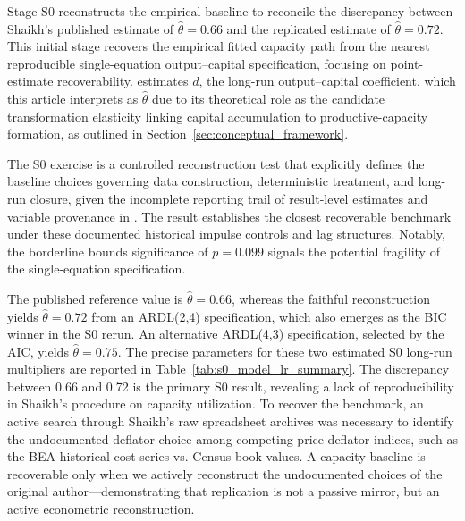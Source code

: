 \documentclass[11pt]{article}
\begin{document}
Stage S0 reconstructs the empirical baseline to reconcile the discrepancy between Shaikh's published estimate of $\hat{\theta}=0.66$ and the replicated estimate of $\hat{\theta}=0.72$. This initial stage recovers the empirical fitted capacity path from the nearest reproducible single-equation output--capital specification, focusing on point-estimate recoverability. \citet{Shaikh2016} estimates $d$, the long-run output--capital coefficient, which this article interprets as $\hat{\theta}$ due to its theoretical role as the candidate transformation elasticity linking capital accumulation to productive-capacity formation, as outlined in Section~\ref{sec:conceptual_framework}.

The S0 exercise is a controlled reconstruction test that explicitly defines the baseline choices governing data construction, deterministic treatment, and long-run closure, given the incomplete reporting trail of result-level estimates and variable provenance in \citet{Shaikh2016}. The result establishes the closest recoverable benchmark under these documented historical impulse controls and lag structures. Notably, the borderline bounds significance of $p=0.099$ signals the potential fragility of the single-equation specification.

The published reference value is $\hat{\theta}=0.66$, whereas the faithful reconstruction yields $\hat{\theta}=0.72$ from an ARDL(2,4) specification, which also emerges as the BIC winner in the S0 rerun. An alternative ARDL(4,3) specification, selected by the AIC, yields $\hat{\theta}=0.75$. The precise parameters for these two estimated S0 long-run multipliers are reported in Table~\ref{tab:s0_model_lr_summary}. The discrepancy between 0.66 and 0.72 is the primary S0 result, revealing a lack of reproducibility in Shaikh's procedure on capacity utilization. To recover the benchmark, an active search through Shaikh's raw spreadsheet archives was necessary to identify the undocumented deflator choice among competing price deflator indices, such as the BEA historical-cost series vs. Census book values. 
A capacity baseline is recoverable only when we actively reconstruct the undocumented choices of the original author—demonstrating that replication is not a passive mirror, but an active econometric reconstruction.
\end{document}

